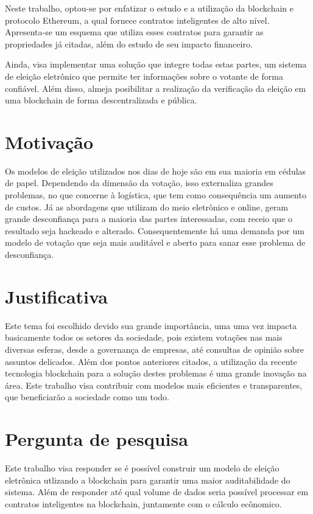 \documentclass{ufsctex/ufsctex}
\begin{document}
Neste trabalho, optou-se por enfatizar o estudo e a utilização da blockchain e
protocolo Ethereum, a qual fornece contratos inteligentes de alto
nível\cite{ethereum}.  Apresenta-se um esquema que utiliza esses contratos para
garantir as propriedades já citadas, além do estudo de seu impacto financeiro.

Ainda, visa implementar uma solução que integre todas estas partes, um sistema
de eleição eletrônico que permite ter informações sobre o votante de forma
confiável. Além disso, almeja posibilitar a realização da verificação da eleição
em uma blockchain de forma descentralizada e pública.

\section{Motivação}

Os modelos de eleição utilizados nos dias de hoje são em sua maioria em cédulas
de papel. Dependendo da dimensão da votação, isso externaliza grandes problemas,
no que concerne à logística, que tem como consequência um aumento de custos. Já
as abordagens que utilizam do meio eletrônico e online, geram grande
desconfiança para a maioria das partes interessadas, com receio que o resultado
seja hackeado e alterado. Consequentemente há uma demanda por um modelo de
votação que seja mais auditável e aberto para sanar esse problema de
desconfiança.

\section{Justificativa}

Este tema foi escolhido devido sua grande importância, uma uma vez impacta
basicamente todos os setores da sociedade, pois existem votações nas mais
diversas esferas, desde a governança de empresas, até consultas de opinião sobre
assuntos delicados.  Além dos pontos anteriores citados, a utilização da recente
tecnologia blockchain para a solução destes problemas é uma grande inovação na
área. Este trabalho visa contribuir com modelos mais eficientes e transparentes,
que beneficiarão a sociedade como um todo.

\section{Pergunta de pesquisa}

Este trabalho visa responder se é possível construir um modelo de eleição
eletrônica utlizando a blockchain para garantir uma maior auditabilidade do
sistema. Além de responder até qual volume de dados seria possível processar em
contratos inteligentes na blockchain, juntamente com o cálculo ecônomico.
\end{document}
